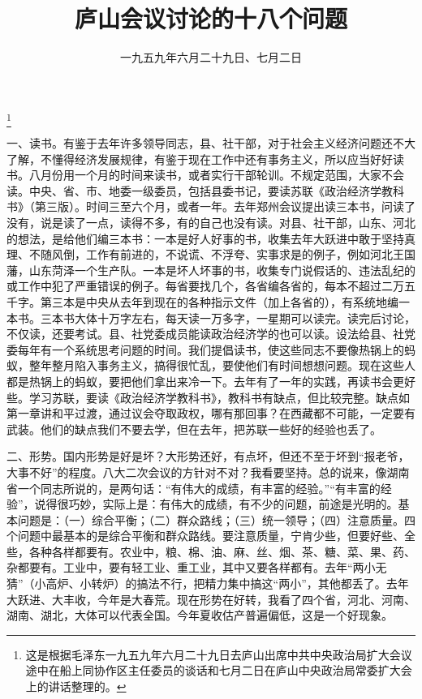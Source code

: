 
\title{庐山会议讨论的十八个问题}
\date{一九五九年六月二十九日、七月二日}
\thanks{这是根据毛泽东一九五九年六月二十九日去庐山出席中共中央政治局扩大会议途中在船上同协作区主任委员的谈话和七月二日在庐山中央政治局常委扩大会上的讲话整理的。}
\maketitle


一、读书。有鉴于去年许多领导同志，县、社干部，对于社会主义经济问题还不大了解，不懂得经济发展规律，有鉴于现在工作中还有事务主义，所以应当好好读书。八月份用一个月的时间来读书，或者实行干部轮训。不规定范围，大家不会读。中央、省、市、地委一级委员，包括县委书记，要读苏联《政治经济学教科书》（第三版）。时间三至六个月，或者一年。去年郑州会议提出读三本书，问读了没有，说是读了一点，读得不多，有的自己也没有读。对县、社干部，山东、河北的想法，是给他们编三本书：一本是好人好事的书，收集去年大跃进中敢于坚持真理、不随风倒，工作有前进的，不说谎、不浮夸、实事求是的例子，例如河北王国藩，山东菏泽一个生产队。一本是坏人坏事的书，收集专门说假话的、违法乱纪的或工作中犯了严重错误的例子。每省要找几个，各省编各省的，每本不超过二万五千字。第三本是中央从去年到现在的各种指示文件（加上各省的），有系统地编一本书。三本书大体十万字左右，每天读一万多字，一星期可以读完。读完后讨论，不仅读，还要考试。县、社党委成员能读政治经济学的也可以读。设法给县、社党委每年有一个系统思考问题的时间。我们提倡读书，使这些同志不要像热锅上的蚂蚁，整年整月陷入事务主义，搞得很忙乱，要使他们有时间想想问题。现在这些人都是热锅上的蚂蚁，要把他们拿出来冷一下。去年有了一年的实践，再读书会更好些。学习苏联，要读《政治经济学教科书》，教科书有缺点，但比较完整。缺点如第一章讲和平过渡，通过议会夺取政权，哪有那回事？在西藏都不可能，一定要有武装。他们的缺点我们不要去学，但在去年，把苏联一些好的经验也丢了。

二、形势。国内形势是好是坏？大形势还好，有点坏，但还不至于坏到“报老爷，大事不好”的程度。八大二次会议的方针对不对？我看要坚持。总的说来，像湖南省一个同志所说的，是两句话：“有伟大的成绩，有丰富的经验。”“有丰富的经验”，说得很巧妙，实际上是：有伟大的成绩，有不少的问题，前途是光明的。基本问题是：（一）综合平衡；（二）群众路线；（三）统一领导；（四）注意质量。四个问题中最基本的是综合平衡和群众路线。要注意质量，宁肯少些，但要好些、全些，各种各样都要有。农业中，粮、棉、油、麻、丝、烟、茶、糖、菜、果、药、杂都要有。工业中，要有轻工业、重工业，其中又要各样都有。去年“两小无猜”（小高炉、小转炉）的搞法不行，把精力集中搞这“两小”，其他都丢了。去年大跃进、大丰收，今年是大春荒。现在形势在好转，我看了四个省，河北、河南、湖南、湖北，大体可以代表全国。今年夏收估产普遍偏低，这是一个好现象。

